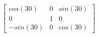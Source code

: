 \documentclass[preview]{standalone}
\begin{document}
\begin{align*}
\left[ \begin{array}{ccc}cos(30) & 0 & sin(30) \\ 0 & 1 & 0 \\ -sin(30) & 0 & cos(30)\end{array} \right]
\end{align*}
\end{document}
